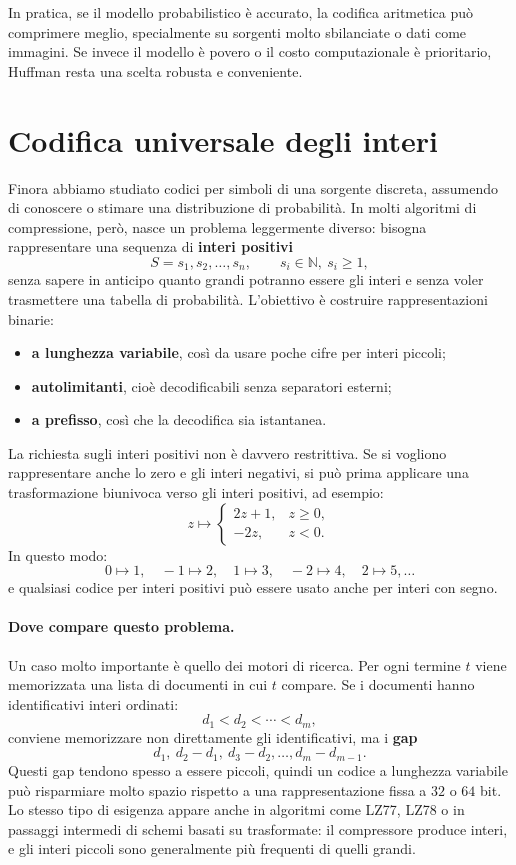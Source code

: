 \documentclass{article}
\theoremstyle{definition}
\numberwithin{equation}{section}
\begin{document}
In pratica, se il modello probabilistico è accurato, la codifica aritmetica può comprimere meglio, specialmente su sorgenti molto sbilanciate o dati come immagini. Se invece il modello è povero o il costo computazionale è prioritario, Huffman resta una scelta robusta e conveniente.

\section{Codifica universale degli interi}
Finora abbiamo studiato codici per simboli di una sorgente discreta, assumendo di conoscere o stimare una distribuzione di probabilità. In molti algoritmi di compressione, però, nasce un problema leggermente diverso: bisogna rappresentare una sequenza di \textbf{interi positivi}
\[
    S=s_1,s_2,\ldots,s_n,
    \qquad s_i\in\mathbb{N},\ s_i\geq 1,
\]
senza sapere in anticipo quanto grandi potranno essere gli interi e senza voler trasmettere una tabella di probabilità. L'obiettivo è costruire rappresentazioni binarie:
\begin{itemize}
    \item \textbf{a lunghezza variabile}, così da usare poche cifre per interi piccoli;
    \item \textbf{autolimitanti}, cioè decodificabili senza separatori esterni;
    \item \textbf{a prefisso}, così che la decodifica sia istantanea.
\end{itemize}

La richiesta sugli interi positivi non è davvero restrittiva. Se si vogliono rappresentare anche lo zero e gli interi negativi, si può prima applicare una trasformazione biunivoca verso gli interi positivi, ad esempio:
\begin{equation}\label{eq:integer_positive_mapping}
    z\mapsto
    \begin{cases}
        2z+1, & z\geq 0, \\
        -2z,  & z<0.
    \end{cases}
\end{equation}
In questo modo:
\[
    0\mapsto 1,\quad -1\mapsto 2,\quad 1\mapsto 3,\quad -2\mapsto 4,\quad 2\mapsto 5,\ldots
\]
e qualsiasi codice per interi positivi può essere usato anche per interi con segno.

\paragraph{Dove compare questo problema.}
Un caso molto importante è quello dei motori di ricerca. Per ogni termine $t$ viene memorizzata una lista di documenti in cui $t$ compare. Se i documenti hanno identificativi interi ordinati:
\[
    d_1<d_2<\cdots<d_m,
\]
conviene memorizzare non direttamente gli identificativi, ma i \textbf{gap}
\[
    d_1,\ d_2-d_1,\ d_3-d_2,\ldots,d_m-d_{m-1}.
\]
Questi gap tendono spesso a essere piccoli, quindi un codice a lunghezza variabile può risparmiare molto spazio rispetto a una rappresentazione fissa a $32$ o $64$ bit. Lo stesso tipo di esigenza appare anche in algoritmi come LZ77, LZ78 o in passaggi intermedi di schemi basati su trasformate: il compressore produce interi, e gli interi piccoli sono generalmente più frequenti di quelli grandi.
\end{document}
